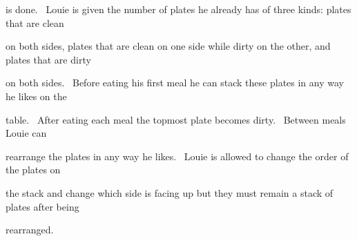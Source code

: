 is done.  Louie is given the number of plates he already has of three kinds: plates that are clean 

on both sides, plates that are clean on one side while dirty on the other, and plates that are dirty 

on both sides.  Before eating his first meal he can stack these plates in any way he likes on the 

table.  After eating each meal the topmost plate becomes dirty.  Between meals Louie can 

rearrange the plates in any way he likes.  Louie is allowed to change the order of the plates on 

the stack and change which side is facing up but they must remain a stack of plates after being 

rearranged.